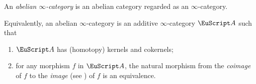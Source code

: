 {\begin{definition}\label{df:abelinfty}
An \emph{abelian $\infty$-category}  is an abelian
category regarded as an $\infty$-category.
\end{definition}
\begin{remark}
Equivalently, an abelian $\infty$-category is an additive $\infty$-category $\cate{A}$
such that
\begin{enumerate}[label=$\roman*$)]
\item $\cate{A}$ has (homotopy) kernels and cokernels;
\item for any morphism $f$ in $\cate{A}$, the natural morphism from the \emph{coimage} of $f$ to the \emph{image} (see \adef{}) of $f$ is an equivalence.
\end{enumerate}
\end{remark}
}

